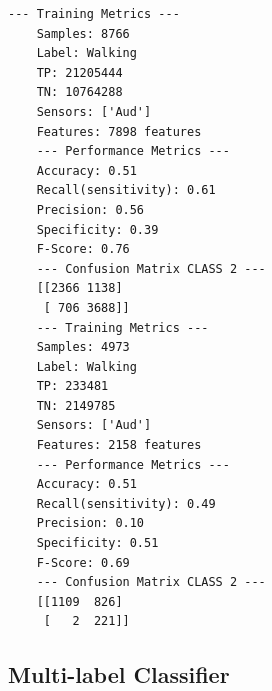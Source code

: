 \documentclass{UoNMCHA}
\numberwithin{equation}{section}
\begin{document}
\begin{lstlisting}[breaklines=true]
    --- Training Metrics ---
    Samples: 8766
    Label: Walking
    TP: 21205444
    TN: 10764288
    Sensors: ['Aud']
    Features: 7898 features
    --- Performance Metrics ---
    Accuracy: 0.51
    Recall(sensitivity): 0.61
    Precision: 0.56
    Specificity: 0.39
    F-Score: 0.76
    --- Confusion Matrix CLASS 2 ---
    [[2366 1138]
     [ 706 3688]]
    --- Training Metrics ---
    Samples: 4973
    Label: Walking
    TP: 233481
    TN: 2149785
    Sensors: ['Aud']
    Features: 2158 features
    --- Performance Metrics ---
    Accuracy: 0.51
    Recall(sensitivity): 0.49
    Precision: 0.10
    Specificity: 0.51
    F-Score: 0.69
    --- Confusion Matrix CLASS 2 ---
    [[1109  826]
     [   2  221]]
\end{lstlisting}
\subsection{Multi-label Classifier}
\end{document}

